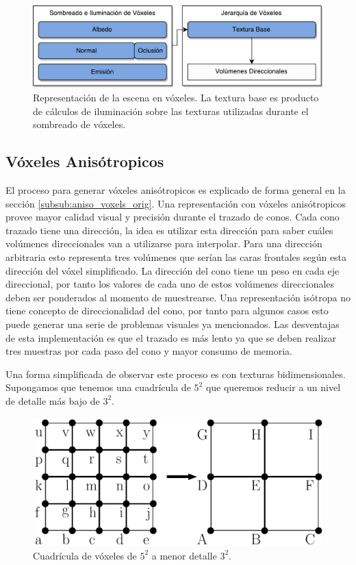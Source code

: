 \begin{figure}[H]
    \centering
    \includegraphics[width=.8\linewidth]{media/representation.pdf}
    \caption{Representación de la escena en vóxeles. La textura base es producto de cálculos de iluminación sobre las texturas utilizadas durante el sombreado de vóxeles.}
\end{figure}
\subsection{Vóxeles Anisótropicos} %
\label{sub:voxeles_anisotropos}
El proceso para generar vóxeles anisótropicos es explicado de forma general en la sección \ref{subsub:aniso_voxels_orig}. Una representación con vóxeles anisótropicos provee mayor calidad visual y precisión durante el trazado de conos. Cada cono trazado tiene una dirección, la idea es utilizar esta dirección para saber cuáles volúmenes direccionales van a utilizarse para interpolar. Para una dirección arbitraria esto representa tres volúmenes que serían las caras frontales según esta dirección del vóxel simplificado. La dirección del cono tiene un peso en cada eje direccional, por tanto los valores de cada uno de estos volúmenes direccionales deben ser ponderados al momento de muestrearse. Una representación isótropa no tiene concepto de direccionalidad del cono, por tanto para algunos casos esto puede generar una serie de problemas visuales ya mencionados. Las desventajas de esta implementación es que el trazado es más lento ya que se deben realizar tres muestras por cada paso del cono y mayor consumo de memoria.

Una forma simplificada de observar este proceso es con texturas bidimensionales. Supongamos que tenemos una cuadrícula de $5^2$ que queremos reducir a un nivel de detalle más bajo de $3^2$.

\begin{figure}[H]
    \centering
    \includegraphics[width=.5\linewidth]{media/filtering_1.pdf}
    \caption{Cuadrícula de vóxeles de $5^2$ a menor detalle $3^2$.}
\end{figure}

